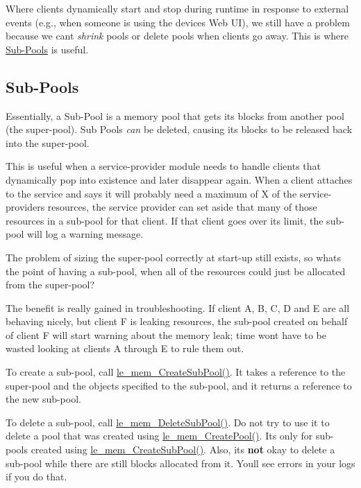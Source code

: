 Where clients dynamically start and stop during runtime in response to external events (e.\+g., when someone is using the device\textquotesingle{}s Web U\+I), we still have a problem because we can\textquotesingle{}t {\itshape shrink} pools or delete pools when clients go away. This is where \hyperlink{c_memory_mem_sub_pools}{Sub-\/\+Pools} is useful.\hypertarget{c_memory_mem_sub_pools}{}\subsection{Sub-\/\+Pools}\label{c_memory_mem_sub_pools}
Essentially, a Sub-\/\+Pool is a memory pool that gets its blocks from another pool (the super-\/pool). Sub Pools {\itshape can} be deleted, causing its blocks to be released back into the super-\/pool.

This is useful when a service-\/provider module needs to handle clients that dynamically pop into existence and later disappear again. When a client attaches to the service and says it will probably need a maximum of X of the service-\/provider\textquotesingle{}s resources, the service provider can set aside that many of those resources in a sub-\/pool for that client. If that client goes over its limit, the sub-\/pool will log a warning message.

The problem of sizing the super-\/pool correctly at start-\/up still exists, so what\textquotesingle{}s the point of having a sub-\/pool, when all of the resources could just be allocated from the super-\/pool?

The benefit is really gained in troubleshooting. If client A, B, C, D and E are all behaving nicely, but client F is leaking resources, the sub-\/pool created on behalf of client F will start warning about the memory leak; time won\textquotesingle{}t have to be wasted looking at clients A through E to rule them out.

To create a sub-\/pool, call {\ttfamily \hyperlink{le__mem_8h_a8b043fcb013deb4c58c90ca2e0ab9d16}{le\+\_\+mem\+\_\+\+Create\+Sub\+Pool()}}. It takes a reference to the super-\/pool and the objects specified to the sub-\/pool, and it returns a reference to the new sub-\/pool.

To delete a sub-\/pool, call {\ttfamily \hyperlink{le__mem_8h_aa1d51a37f572c2d891cdfb625ea19f27}{le\+\_\+mem\+\_\+\+Delete\+Sub\+Pool()}}. Do not try to use it to delete a pool that was created using \hyperlink{le__mem_8h_ab91efaa2978c9c1c7b2427d25b33241c}{le\+\_\+mem\+\_\+\+Create\+Pool()}. It\textquotesingle{}s only for sub-\/pools created using \hyperlink{le__mem_8h_a8b043fcb013deb4c58c90ca2e0ab9d16}{le\+\_\+mem\+\_\+\+Create\+Sub\+Pool()}. Also, it\textquotesingle{}s {\bfseries not} okay to delete a sub-\/pool while there are still blocks allocated from it. You\textquotesingle{}ll see errors in your logs if you do that.

